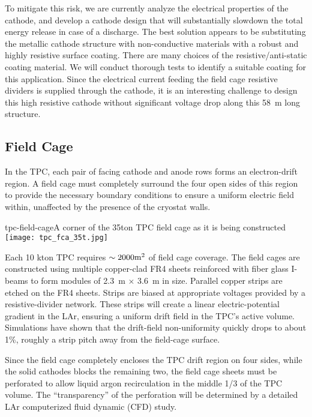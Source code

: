 To mitigate this risk, we are currently analyze the electrical properties of the cathode, and develop a cathode design that will substantially slowdown the total energy release in case of a discharge.  The best solution appears to be substituting the metallic cathode structure with non-conductive materials with a robust and highly resistive surface coating.  There are many choices of the resistive/anti-static coating material.  We will conduct thorough tests to identify a suitable coating for this application.  Since the electrical current feeding the field cage resistive dividers is supplied through the cathode, it is an interesting challenge to design this high resistive cathode without significant voltage drop along this 58~m long structure.


\subsection{Field Cage}
\label{subsec:fd-ref-fieldcage}

In the TPC, each pair of facing cathode and anode rows forms an electron-drift region. A field cage must completely surround the four open sides of this region
to provide the necessary boundary conditions to ensure a uniform electric field within, unaffected by the presence of the cryostat walls.


\begin{cdrfigure}{tpc-field-cage}{A corner of the 35ton TPC field cage as it is being constructed}
\texttt{[image: tpc\_fca\_35t.jpg]}
\end{cdrfigure}


Each 10 kton TPC requires $\sim 2000 \rm{m}^2$ of field 
cage coverage. The field cages are constructed using multiple copper-clad FR4 sheets reinforced with fiber glass I-beams to form modules of 2.3~m $\times$ 3.6~m in size. Parallel copper strips are etched on the FR4 sheets. Strips are biased at appropriate voltages provided by a resistive-divider network. These strips will create a linear electric-potential gradient in the LAr, ensuring a uniform drift field in the TPC's active volume.  Simulations have shown that the drift-field non-uniformity quickly drops to about 1\%, roughly a strip pitch away from the field-cage surface. 

Since the field cage completely encloses the TPC drift region on four sides, while the solid cathodes blocks the remaining two, the field cage sheets must be  perforated to allow liquid argon recirculation in the middle 1/3 of the TPC volume. The ``transparency'' of the perforation will be determined by a detailed LAr computerized fluid dynamic (CFD) study.

